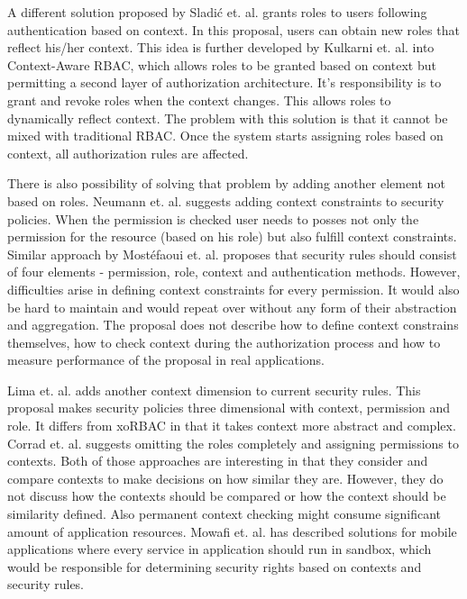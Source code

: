 \documentclass{sig-alternate}
\begin{document}
A different solution proposed by Sladi\'c et. al. \cite{contextaccess} grants roles to users following authentication based on context. In this proposal, users can obtain new roles that reflect his/her context. This idea is further developed by  Kulkarni et. al. \cite{contextawarerbac} into Context-Aware RBAC, which allows roles to be granted based on context but permitting a second layer of authorization architecture. It's responsibility is to grant and revoke roles when the context changes.  This allows roles to dynamically reflect context. The problem with this solution is that it cannot be mixed with traditional RBAC. Once the system starts assigning roles based on context, all authorization rules are affected. 

There is also possibility of solving that problem by adding another element not based on roles. Neumann et. al. \cite{xorbac} suggests adding context constraints to security policies. When the permission is checked user needs to posses not only the permission for the resource (based on his role) but also fulfill context constraints. Similar approach by Most\'efaoui et. al. \cite{genericcontext} proposes that security rules should consist of four elements - permission, role, context and authentication methods. However, difficulties arise in defining context constraints for every permission. It would also be hard to maintain and would repeat over without any form of their abstraction and aggregation. The proposal does not describe how to define context constrains themselves, how to check context during the authorization process and how to measure performance of the proposal in real applications.

Lima et. al. \cite{contextlayer} adds another context dimension to current security rules. This proposal makes security policies three dimensional with context, permission and role. It differs from xoRBAC \cite{xorbac} in that it takes context more abstract and complex. Corrad et. al. \cite{ubiscom} suggests omitting the roles completely and assigning permissions to contexts. Both of those approaches are interesting in that they consider and compare contexts to make decisions on how similar they are. However,  they do not discuss how the contexts should be compared or how the context should be similarity defined. Also permanent context checking might consume significant amount of application resources. Mowafi et. al. \cite{contextAwareMobile} has described solutions for mobile applications where every service in application should run in sandbox, which would be responsible for determining security rights based on contexts and security rules.
\end{document}
